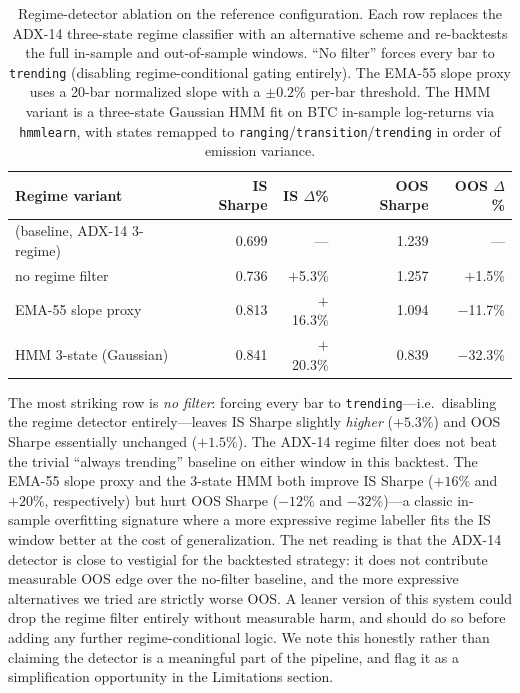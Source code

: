 \documentclass{article}
\begin{document}
\begin{table}[h]
\centering
\caption{Regime-detector ablation on the reference configuration. Each row replaces the ADX-14 three-state regime classifier with an alternative scheme and re-backtests the full in-sample and out-of-sample windows. ``No filter'' forces every bar to \texttt{trending} (disabling regime-conditional gating entirely). The EMA-55 slope proxy uses a 20-bar normalized slope with a $\pm 0.2\%$ per-bar threshold. The HMM variant is a three-state Gaussian HMM fit on BTC in-sample log-returns via \texttt{hmmlearn}, with states remapped to \texttt{ranging}/\texttt{transition}/\texttt{trending} in order of emission variance.}
\label{tab:ablation_regime}
\small
\begin{tabular}{@{}lrrrr@{}}
\toprule
\textbf{Regime variant} & \textbf{IS Sharpe} & \textbf{IS $\Delta$\%} & \textbf{OOS Sharpe} & \textbf{OOS $\Delta$\%} \\
\midrule
(baseline, ADX-14 3-regime) & 0.699 & --- & 1.239 & --- \\
no regime filter            & 0.736 & $+$5.3\% & 1.257 & $+$1.5\% \\
EMA-55 slope proxy          & 0.813 & $+$16.3\% & 1.094 & $-$11.7\% \\
HMM 3-state (Gaussian)      & 0.841 & $+$20.3\% & 0.839 & $-$32.3\% \\
\bottomrule
\end{tabular}
\end{table}

The most striking row is \emph{no filter}: forcing every bar to \texttt{trending}---i.e.\ disabling the regime detector entirely---leaves IS Sharpe slightly \emph{higher} ($+5.3\%$) and OOS Sharpe essentially unchanged ($+1.5\%$).
The ADX-14 regime filter does not beat the trivial ``always trending'' baseline on either window in this backtest.
The EMA-55 slope proxy and the 3-state HMM both improve IS Sharpe ($+16\%$ and $+20\%$, respectively) but hurt OOS Sharpe ($-12\%$ and $-32\%$)---a classic in-sample overfitting signature where a more expressive regime labeller fits the IS window better at the cost of generalization.
The net reading is that the ADX-14 detector is close to vestigial for the backtested strategy: it does not contribute measurable OOS edge over the no-filter baseline, and the more expressive alternatives we tried are strictly worse OOS.
A leaner version of this system could drop the regime filter entirely without measurable harm, and should do so before adding any further regime-conditional logic.
We note this honestly rather than claiming the detector is a meaningful part of the pipeline, and flag it as a simplification opportunity in the Limitations section.
\end{document}
